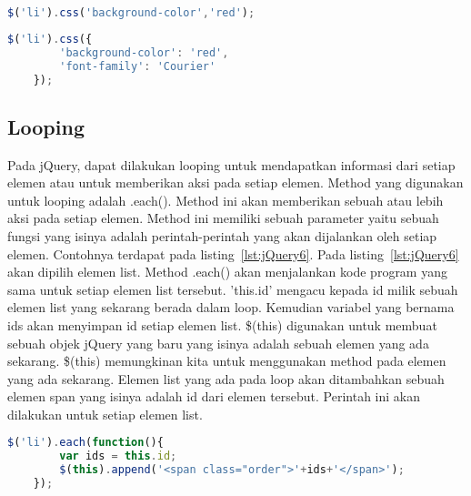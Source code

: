 \begin{lstlisting}[language=Javascript, caption=Mengubah warna background color semua elemen list, label={lst:jQuery8}]
	$('li').css('background-color','red');
\end{lstlisting}

\begin{lstlisting}[language=Javascript, caption=Mengubah warna background color dan jenis font untuk semua elemen list, label={lst:jQuery9}]
	$('li').css({
		'background-color': 'red',
		'font-family': 'Courier'
	});
\end{lstlisting}

\subsection{Looping}
Pada jQuery, dapat dilakukan looping untuk mendapatkan informasi dari setiap elemen atau untuk memberikan aksi pada setiap elemen. Method yang digunakan untuk looping adalah .each(). Method ini akan memberikan sebuah atau lebih aksi pada setiap elemen. Method ini memiliki sebuah parameter yaitu sebuah fungsi yang isinya adalah perintah-perintah yang akan dijalankan oleh setiap elemen. Contohnya terdapat pada listing~\ref{lst:jQuery6}. Pada listing~\ref{lst:jQuery6} akan dipilih elemen list. Method .each() akan menjalankan kode program yang sama untuk setiap elemen list tersebut. 'this.id' mengacu kepada id milik sebuah elemen list yang sekarang berada dalam loop. Kemudian variabel yang bernama ids akan menyimpan id setiap elemen list. \$(this) digunakan untuk membuat sebuah objek jQuery yang baru yang isinya adalah sebuah elemen yang ada sekarang. \$(this) memungkinan kita untuk menggunakan method pada elemen yang ada sekarang. Elemen list yang ada pada loop akan ditambahkan sebuah elemen span yang isinya adalah id dari elemen tersebut. Perintah ini akan dilakukan untuk setiap elemen list.

\begin{lstlisting}[language=Javascript, caption=Menambah setiap elemen list dengan id list masing-masing , label={lst:jQuery6}]
	$('li').each(function(){
		var ids = this.id;
		$(this).append('<span class="order">'+ids+'</span>');
	});
\end{lstlisting}

